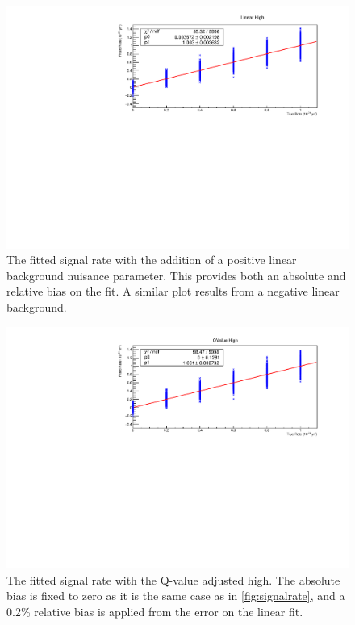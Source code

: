 \begin{figure}
\centering
\includegraphics[width=0.7\linewidth]{Figures/Appendix_Figures/LinearHigh.pdf}
\caption[The fitted signal rate with the addition of a positive linear background nuisance parameter.]
{The fitted signal rate with the addition of a positive linear background nuisance parameter.
This provides both an absolute and relative bias on the fit.
A similar plot results from a negative linear background.}
\label{fig:linearhigh}
\end{figure}

\begin{figure}
\centering
\includegraphics[width=0.7\linewidth]{Figures/Appendix_Figures/QValueHigh.pdf}
\caption[The fitted signal rate with the Q-value adjusted high.]
{The fitted signal rate with the Q-value adjusted high.
The absolute bias is fixed to zero as it is the same case as in \autoref{fig:signalrate}, and a 0.2\% relative bias is applied from the error on the linear fit.}
\label{fig:qvaluehigh}
\end{figure}

